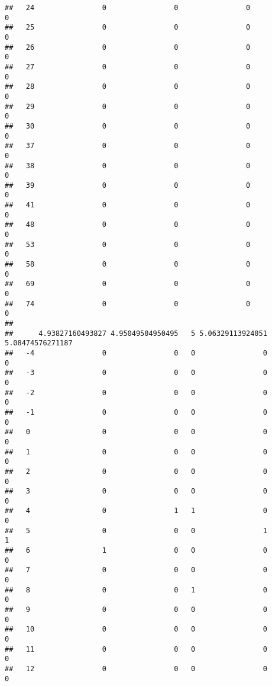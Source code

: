 \documentclass[]{article}
\begin{document}
\begin{verbatim}
##   24                0                0                0                0
##   25                0                0                0                0
##   26                0                0                0                0
##   27                0                0                0                0
##   28                0                0                0                0
##   29                0                0                0                0
##   30                0                0                0                0
##   37                0                0                0                0
##   38                0                0                0                0
##   39                0                0                0                0
##   41                0                0                0                0
##   48                0                0                0                0
##   53                0                0                0                0
##   58                0                0                0                0
##   69                0                0                0                0
##   74                0                0                0                0
##     
##      4.93827160493827 4.95049504950495   5 5.06329113924051 5.08474576271187
##   -4                0                0   0                0                0
##   -3                0                0   0                0                0
##   -2                0                0   0                0                0
##   -1                0                0   0                0                0
##   0                 0                0   0                0                0
##   1                 0                0   0                0                0
##   2                 0                0   0                0                0
##   3                 0                0   0                0                0
##   4                 0                1   1                0                0
##   5                 0                0   0                1                1
##   6                 1                0   0                0                0
##   7                 0                0   0                0                0
##   8                 0                0   1                0                0
##   9                 0                0   0                0                0
##   10                0                0   0                0                0
##   11                0                0   0                0                0
##   12                0                0   0                0                0

\end{verbatim}
\end{document}
